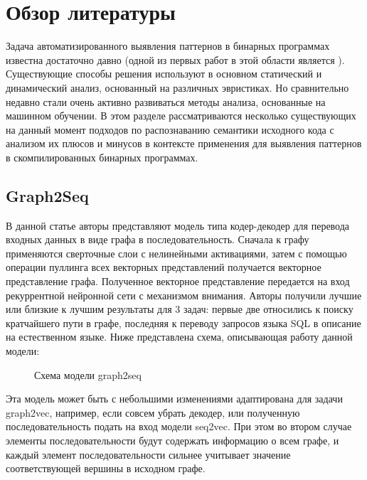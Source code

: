 \section{Обзор литературы}
Задача автоматизированного выявления паттернов в бинарных программах известна достаточно давно (одной из первых работ в этой области является \cite{bugs}). Существующие способы решения используют в основном статический и динамический анализ, основанный на различных эвристиках. Но сравнительно недавно стали очень активно развиваться методы анализа, основанные на машинном обучении. В этом разделе рассматриваются несколько существующих на данный момент подходов по распознаванию семантики исходного кода с анализом их плюсов и минусов в контексте применения для выявления паттернов в скомпилированных бинарных программах.

\subsection{Graph2Seq}
В данной статье\cite{xu2018graph2seq} авторы представляют модель типа кодер-декодер для перевода входных данных в виде графа в последовательность. Сначала к графу применяются сверточные слои с нелинейными активациями, затем с помощью операции пуллинга всех векторных представлений получается векторное представление графа. Полученное векторное представление передается на вход рекуррентной нейронной сети с механизмом внимания. Авторы получили лучшие или близкие к лучшим результаты для 3 задач: первые две относились к поиску кратчайшего пути в графе, последняя к переводу запросов языка SQL в описание на естественном языке. Ниже представлена схема, описывающая работу данной модели:
\begin{figure}[h]
    \caption{Схема модели graph2seq}
\end{figure}

Эта модель может быть с небольшими изменениями адаптирована для задачи graph2vec, например, если совсем убрать декодер, или полученную последовательность подать на вход модели seq2vec. При этом во втором случае элементы последовательности будут содержать информацию о всем графе, и каждый элемент последовательности сильнее учитывает значение соответствующей вершины в исходном графе.

